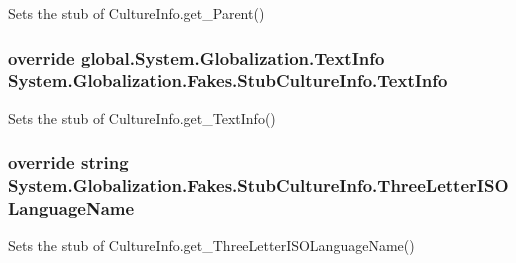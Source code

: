 Sets the stub of Culture\-Info.\-get\-\_\-\-Parent()

\hypertarget{class_system_1_1_globalization_1_1_fakes_1_1_stub_culture_info_a2be10135b4140c4ac3ec0b902661846a}{
\subsubsection[{Text\-Info}]{\setlength{\rightskip}{0pt plus 5cm}override global.\-System.\-Globalization.\-Text\-Info System.\-Globalization.\-Fakes.\-Stub\-Culture\-Info.\-Text\-Info\hspace{0.3cm}{\ttfamily [get]}}}\label{class_system_1_1_globalization_1_1_fakes_1_1_stub_culture_info_a2be10135b4140c4ac3ec0b902661846a}


Sets the stub of Culture\-Info.\-get\-\_\-\-Text\-Info()

\hypertarget{class_system_1_1_globalization_1_1_fakes_1_1_stub_culture_info_ac78ca943306a03273281a4658c435e98}{
\subsubsection[{Three\-Letter\-I\-S\-O\-Language\-Name}]{\setlength{\rightskip}{0pt plus 5cm}override string System.\-Globalization.\-Fakes.\-Stub\-Culture\-Info.\-Three\-Letter\-I\-S\-O\-Language\-Name\hspace{0.3cm}{\ttfamily [get]}}}\label{class_system_1_1_globalization_1_1_fakes_1_1_stub_culture_info_ac78ca943306a03273281a4658c435e98}


Sets the stub of Culture\-Info.\-get\-\_\-\-Three\-Letter\-I\-S\-O\-Language\-Name()

